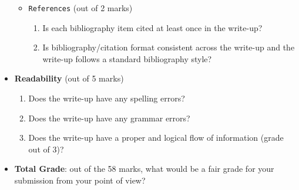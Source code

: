 \begin{itemize}
\begin{itemize}
\begin{enumerate}
                \answerTODO{}
        \end{enumerate}
        \item \texttt{References} (out of 2 marks)
        \begin{enumerate}
            \item Is each bibliography item cited at least once in the write-up?
                \answerTODO{}
            \item Is bibliography/citation format consistent across the write-up and the write-up follows a standard bibliography style?
                \answerTODO{}
        \end{enumerate}
    \end{itemize}
    \item \textbf{Readability} (out of 5 marks)
    \begin{enumerate}
        \item Does the write-up have any spelling errors?
            \answerTODO{}
        \item Does the write-up have any grammar errors?
            \answerTODO{}
        \item Does the write-up have a proper and logical flow of information (grade out of 3)?
            \answerTODO{}
    \end{enumerate}
    \item \textbf{Total Grade}: out of the 58 marks, what would be a fair grade for your submission from your point of view?
        \answerTODO{}
\end{itemize}
